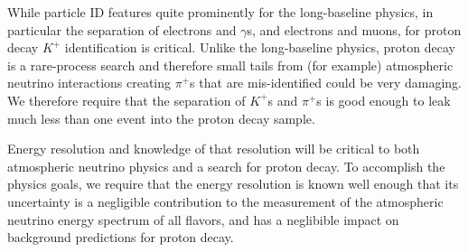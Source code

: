 While particle ID features quite prominently for the long-baseline physics, in
particular the separation of electrons and $\gamma$s, and electrons and muons,
for proton decay $K^+$ identification is critical.  Unlike the long-baseline
physics, proton decay is a rare-process search and therefore small tails from
(for example) atmospheric neutrino interactions creating $\pi^+$s that are
mis-identified could be very damaging. We therefore require that the separation
of $K^+$s and $\pi^+$s is good enough to leak much less than one event into the
proton decay sample.

Energy resolution and knowledge of that resolution will be critical to both
atmospheric neutrino physics and a search for proton decay.  To accomplish the
physics goals, we require that the energy resolution is known well enough that
its uncertainty is a negligible contribution to the measurement of the
atmospheric neutrino energy spectrum of all flavors, and has a neglibible
impact on background predictions for proton decay.



